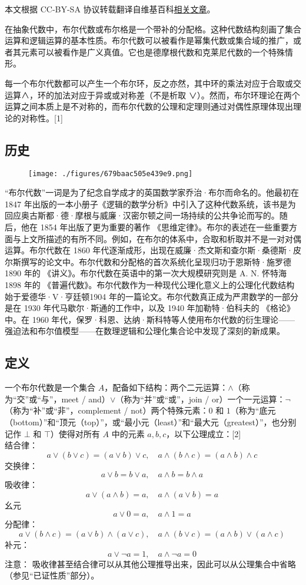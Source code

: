 
本文根据 CC-BY-SA 协议转载翻译自维基百科\href{https://en.wikipedia.org/wiki/Boolean_algebra_(structure)}{相关文章}。

在抽象代数中，布尔代数或布尔格是一个带补的分配格。这种代数结构刻画了集合运算和逻辑运算的基本性质。布尔代数可以被看作是幂集代数或集合域的推广，或者其元素可以被看作是广义真值。它也是德摩根代数和克莱尼代数的一个特殊情形。

每一个布尔代数都可以产生一个布尔环，反之亦然，其中环的乘法对应于合取或交运算∧，环的加法对应于异或或对称差（不是析取 ∨）。然而，布尔环理论在两个运算之间本质上是不对称的，而布尔代数的公理和定理则通过对偶性原理体现出理论的对称性。[1]
\subsection{历史}
\begin{figure}[ht]
\centering
\texttt{[image: ./figures/679baac505e439e9.png]}
\caption{} \label{fig_BRds_1}
\end{figure}
“布尔代数”一词是为了纪念自学成才的英国数学家乔治·布尔而命名的。他最初在 1847 年出版的一本小册子《逻辑的数学分析》中引入了这种代数系统，该书是为回应奥古斯都·德·摩根与威廉·汉密尔顿之间一场持续的公共争论而写的。随后，他在 1854 年出版了更为重要的著作 《思维定律》。布尔的表述在一些重要方面与上文所描述的有所不同。例如，在布尔的体系中，合取和析取并不是一对对偶运算。布尔代数在 1860 年代逐渐成形，出现在威廉·杰文斯和查尔斯·桑德斯·皮尔斯撰写的论文中。布尔代数和分配格的首次系统化呈现归功于恩斯特·施罗德1890 年的 《讲义》。布尔代数在英语中的第一次大规模研究则是 A. N. 怀特海1898 年的 《普遍代数》。布尔代数作为一种现代公理化意义上的公理化代数结构始于爱德华·V·亨廷顿1904 年的一篇论文。布尔代数真正成为严肃数学的一部分是在 1930 年代马歇尔·斯通的工作中，以及 1940 年加勒特·伯科夫的 《格论》 中。在 1960 年代，保罗·科恩、达纳·斯科特等人使用布尔代数的衍生理论——强迫法和布尔值模型——在数理逻辑和公理化集合论中发现了深刻的新成果。
\subsection{定义}
一个布尔代数是一个集合 $A$，配备如下结构：两个二元运算：$\land$（称为“交”或“与”，meet / and）$\lor$（称为“并”或“或”，join / or）一个一元运算：$\lnot$（称为“补”或“非”，complement / not）两个特殊元素：$0$ 和 $1$（称为“底元（bottom）”和“顶元（top）”，或“最小元（least）”和“最大元（greatest）”，也分别记作 $\bot$ 和 $\top$）使得对所有 $A$ 中的元素 $a, b, c$，以下公理成立：[2]\\
结合律：
   $$
   a \lor (b \lor c) = (a \lor b) \lor c, \quad  
   a \land (b \land c) = (a \land b) \land c~
   $$
交换律：
   $$
   a \lor b = b \lor a, \quad  
   a \land b = b \land a~
   $$
吸收律：
   $$
   a \lor (a \land b) = a, \quad  
   a \land (a \lor b) = a~
   $$
幺元
   $$
   a \lor 0 = a, \quad  
   a \land 1 = a~
   $$
分配律：
   $$
   a \lor (b \land c) = (a \lor b) \land (a \lor c), \quad  
   a \land (b \lor c) = (a \land b) \lor (a \land c)~
   $$
补元：
   $$
   a \lor \lnot a = 1, \quad  
   a \land \lnot a = 0~
   $$
注意： 吸收律甚至结合律可以从其他公理推导出来，因此可以从公理集合中省略（参见“已证性质”部分）。

